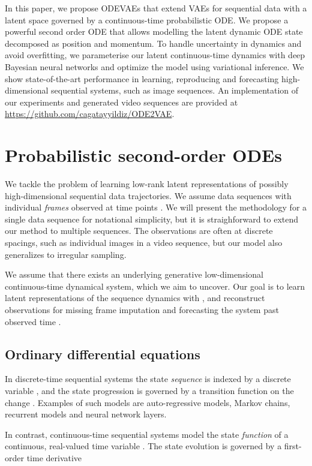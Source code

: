 \documentclass{article}
\newcommand{\0}{\mathbf{0}}
\begin{document}
In this paper, we propose ODEVAEs that extend VAEs for sequential data with a latent space governed by a continuous-time probabilistic ODE. We propose a powerful second order ODE that allows modelling the latent dynamic ODE state decomposed as position and momentum. 
To handle uncertainty in dynamics and avoid overfitting, we parameterise our latent continuous-time dynamics with deep Bayesian neural networks and optimize the model using variational inference. 
We show state-of-the-art performance in learning, reproducing and forecasting  high-dimensional sequential systems, such as image sequences.
An implementation of our experiments and generated video sequences are provided at \href{https://github.com/cagatayyildiz/ODE2VAE}{https://github.com/cagatayyildiz/ODE2VAE}.

\section{Probabilistic second-order ODEs}


We tackle the problem of learning low-rank latent representations of possibly high-dimensional sequential data trajectories. We assume data sequences  with individual \emph{frames}  observed at time points . We will present the methodology for a single data sequence  for notational simplicity, but it is straighforward to extend our method to multiple sequences. The observations are often at discrete spacings, such as individual images in a video sequence, but our model also generalizes to irregular sampling. 

We assume that there exists an underlying generative low-dimensional continuous-time dynamical system, which we aim to uncover. Our goal is to learn latent representations  of the sequence dynamics with , and reconstruct observations  for missing frame imputation and forecasting the system past observed time .

\subsection{Ordinary differential equations}
In discrete-time sequential systems the state \emph{sequence}  is indexed by a discrete variable , and the state progression is governed by a transition function on the change . Examples of such models are auto-regressive models, Markov chains, recurrent models and neural network layers.

In contrast, continuous-time sequential systems model the state \emph{function}  of a continuous, real-valued time variable . The state evolution is governed by a first-order time derivative
\end{document}
